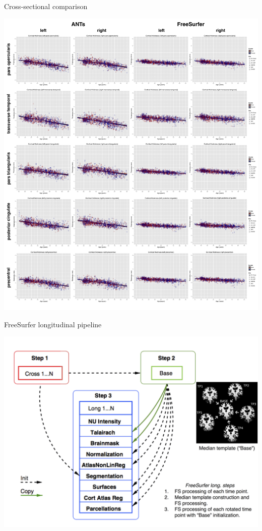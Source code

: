 \documentclass[ignorenonframetext,]{beamer}
\begin{document}
\begin{frame}{Cross-sectional comparison}

\centering
\includegraphics[width=0.99 \textwidth]{../../Figures/rfImportanceRegions.pdf}

\end{frame}

\begin{frame}{FreeSurfer longitudinal pipeline}

\centering
\includegraphics[width=0.85 \textwidth]{../../Figures/FreeSurferLong.png}

\end{frame}
\end{document}
